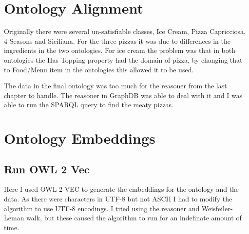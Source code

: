 \documentclass[11pt]{report} %
\begin{document}
\chapter{Ontology Alignment}
Originally there were several un-satisfiable classes, Ice Cream, Pizza Capricciosa, 4 Seasons and Siciliana.
For the three pizzas it was due to differences in the ingredients in the two ontologies.
For ice cream the problem was that in both ontologies the Has Topping property had the domain of pizza, by changing that to Food/Menu item in the ontologies this allowed it to be used.

The data in the final ontology was too much for the reasoner from the last chapter to handle.
The reasoner in GraphDB was able to deal with it and I was able to run the SPARQL query to find the meaty pizzas.



\chapter{Ontology Embeddings}

\section{Run OWL 2 Vec}
Here I used OWL 2 VEC to generate the embeddings for the ontology and the data.
As there were characters in UTF-8 but not ASCII I had to modify the algorithm to use UTF-8 encodings.
I tried using the reasoner and Weisfeiler-Leman walk, but these caused the algorithm to run for an indefinate amount of time.
\end{document}
